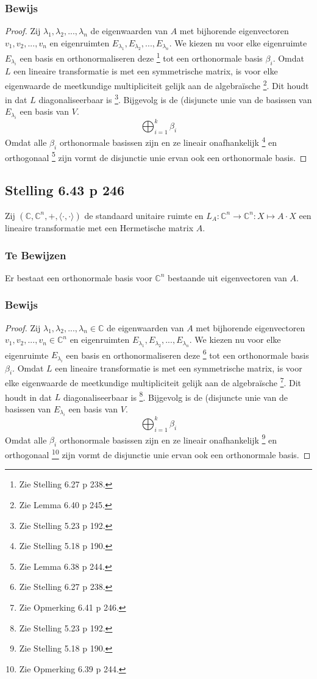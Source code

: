 \documentclass[lineaire_algebra_oplossingen.tex]{subfiles}
\begin{document}
\subsubsection*{Bewijs}
\begin{proof}
Zij $\lambda_1,\lambda_2,...,\lambda_n$ de eigenwaarden van $A$ met bijhorende eigenvectoren $v_1,v_2,...,v_n$ en eigenruimten $E_{\lambda_1},E_{\lambda_2},...,E_{\lambda_n}$.
We kiezen nu voor elke eigenruimte $E_{\lambda_i}$ een basis en orthonormaliseren deze \footnote{Zie Stelling 6.27 p 238.} tot een orthonormale basis $\beta_i$.
Omdat $L$ een lineaire transformatie is met een symmetrische matrix, is voor elke eigenwaarde de meetkundige multipliciteit gelijk aan de algebra\"ische \footnote{Zie Lemma 6.40 p 245.}.
Dit houdt in dat $L$ diagonaliseerbaar is \footnote{Zie Stelling 5.23 p 192.}.
Bijgevolg is de (disjuncte unie van de basissen van $E_{\lambda_i}$ een basis van $V$.
\[
\bigoplus_{i=1}^k \beta_i
\]
Omdat alle $\beta_i$ orthonormale basissen zijn en ze lineair onafhankelijk \footnote{Zie Stelling 5.18 p 190.} en orthogonaal \footnote{Zie Lemma 6.38 p 244.} zijn vormt de disjunctie unie ervan ook een orthonormale basis.
\end{proof}


\subsection{Stelling 6.43 p 246}
\label{6.43}
Zij $(\mathbb{C},\mathbb{C}^n,+,\langle \cdot,\cdot \rangle)$ de standaard unitaire ruimte en $L_A: \mathbb{C}^n\rightarrow\mathbb{C}^n: X\mapsto A\cdot X$ een lineaire transformatie met een Hermetische matrix $A$.

\subsubsection*{Te Bewijzen}
Er bestaat een orthonormale basis voor $\mathbb{C}^n$ bestaande uit eigenvectoren van $A$.

\subsubsection*{Bewijs}
\begin{proof}
Zij $\lambda_1,\lambda_2,...,\lambda_n \in \mathbb{C}$ de eigenwaarden van $A$ met bijhorende eigenvectoren $v_1,v_2,...,v_n \in \mathbb{C}^n$ en eigenruimten $E_{\lambda_1},E_{\lambda_2},...,E_{\lambda_n}$.
We kiezen nu voor elke eigenruimte $E_{\lambda_i}$ een basis en orthonormaliseren deze \footnote{Zie Stelling 6.27 p 238.} tot een orthonormale basis $\beta_i$.
Omdat $L$ een lineaire transformatie is met een symmetrische matrix, is voor elke eigenwaarde de meetkundige multipliciteit gelijk aan de algebra\"ische \footnote{Zie Opmerking 6.41 p 246.}.
Dit houdt in dat $L$ diagonaliseerbaar is \footnote{Zie Stelling 5.23 p 192.}.
Bijgevolg is de (disjuncte unie van de basissen van $E_{\lambda_i}$ een basis van $V$.
\[
\bigoplus_{i=1}^k \beta_i
\]
Omdat alle $\beta_i$ orthonormale basissen zijn en ze lineair onafhankelijk \footnote{Zie Stelling 5.18 p 190.} en orthogonaal \footnote{Zie Opmerking 6.39 p 244.} zijn vormt de disjunctie unie ervan ook een orthonormale basis.
\end{proof}
\end{document}

